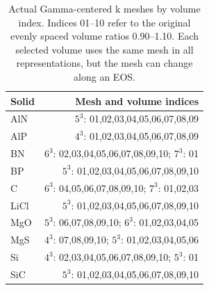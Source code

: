 \begin{table}[t]
\centering
\small
\caption{Actual Gamma-centered k meshes by volume index. Indices 01--10 refer to the original evenly spaced volume ratios 0.90--1.10. Each selected volume uses the same mesh in all representations, but the mesh can change along an EOS.}
\label{tab:actual-k-meshes}
\begin{tabular}{lr}
\toprule
Solid & Mesh and volume indices \\
\midrule
AlN & $5^3$: 01,02,03,04,05,06,07,08,09 \\
AlP & $4^3$: 01,02,03,04,05,06,07,08,09 \\
BN & $6^3$: 02,03,04,05,06,07,08,09,10; $7^3$: 01 \\
BP & $5^3$: 01,02,03,04,05,06,07,08,09,10 \\
C & $6^3$: 04,05,06,07,08,09,10; $7^3$: 01,02,03 \\
LiCl & $5^3$: 01,02,03,04,05,06,07,08,09,10 \\
MgO & $5^3$: 06,07,08,09,10; $6^3$: 01,02,03,04,05 \\
MgS & $4^3$: 07,08,09,10; $5^3$: 01,02,03,04,05,06 \\
Si & $4^3$: 02,03,04,05,06,07,08,09,10; $5^3$: 01 \\
SiC & $5^3$: 01,02,03,04,05,06,07,08,09,10 \\
\bottomrule
\end{tabular}
\end{table}
